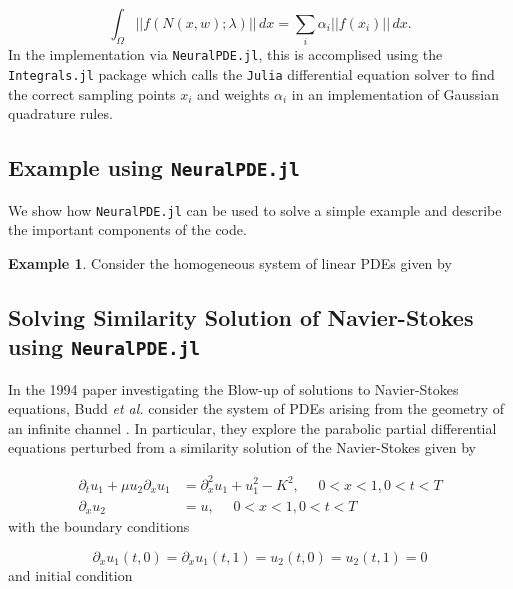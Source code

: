 \documentclass{CUP-JNL-DTM}%
\theoremstyle{definition}
\newtheorem{example}[theorem]{Example}
\numberwithin{equation}{section}
\newcommand{\Julia}{\texttt{Julia} }
\begin{document}
\begin{equation}
	\int_{\Omega} ||f(N(x,w); \lambda)||\,dx = \sum_i \alpha_i ||f(x_i)||\,dx.
\end{equation}
In the implementation via \texttt{NeuralPDE.jl}, this is accomplised using the \texttt{Integrals.jl} package which calls the \Julia differential equation solver \cite{rackauckasDifferentialEquationsJlPerformant2017} to find the correct sampling points $x_i$ and weights $\alpha_i$ in an implementation of Gaussian quadrature rules. 

\subsection{Example using \texttt{NeuralPDE.jl}}

We show how \texttt{NeuralPDE.jl} can be used to solve a simple example and describe the important components of the code. 

\begin{example}

Consider the homogeneous system of linear PDEs given by
    
\end{example}

\subsection{Solving Similarity Solution of Navier-Stokes using \texttt{NeuralPDE.jl}}

In the 1994 paper investigating the Blow-up of solutions to Navier-Stokes equations, Budd \textit{et al.} consider the system of PDEs arising from the geometry of an infinite channel \cite{buddBlowupSystemPartial1994}. In particular, they explore the parabolic partial differential equations perturbed from a similarity solution of the Navier-Stokes given by

\begin{equation}
\begin{split}
    \partial_t u_1 + \mu u_2 \partial_x u_1 & = \partial^2_{x} u_1 + u_1^2 - K^2, \,\,\,\,\,\,\,\, 0 < x < 1, 0 < t < T \\
    \partial_x u_2 & = u, \,\,\,\,\,\,\,\, 0 < x < 1, 0 < t < T
    \label{eqn:ns_problem}
\end{split}
\end{equation}
with the boundary conditions 

\begin{equation}
    \partial_x u_1(t,0) = \partial_x u_1(t,1) = u_2(t,0) = u_2(t,1) = 0
\end{equation}
and initial condition 
\end{document}
